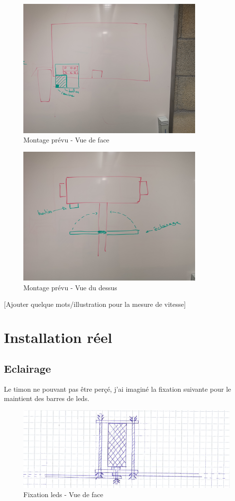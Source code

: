 \begin{figure}[H]
    \centering
    \includegraphics[height=7cm]{assets/figures/montage2.jpg}
    \caption{Montage prévu - Vue de face}
\end{figure}

\begin{figure}[H]
    \centering
    \includegraphics[height=7cm]{assets/figures/montage3.jpg}
    \caption{Montage prévu - Vue du dessus}
\end{figure}

[Ajouter quelque mots/illustration pour la mesure de vitesse]
\section{Installation réel}
\subsection{Eclairage}
Le timon ne pouvant pas être perçé, j'ai imaginé la fixation suivante pour le maintient des barres de leds.

\begin{figure}[H]
    \centering
    \includegraphics[width=13cm]{assets/figures/fixation_eclairage_face.PNG}
    \caption{Fixation leds - Vue de face}
\end{figure}

